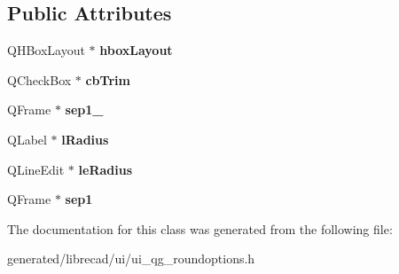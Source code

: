 \subsection*{Public Attributes}
\begin{DoxyCompactItemize}
\item 
\hypertarget{classUi__QG__RoundOptions_a55968d6979845fae80e27868399baea1}{Q\-H\-Box\-Layout $\ast$ {\bfseries hbox\-Layout}}\label{classUi__QG__RoundOptions_a55968d6979845fae80e27868399baea1}

\item 
\hypertarget{classUi__QG__RoundOptions_a46394f6279ed6edc93a2f8940219ec3c}{Q\-Check\-Box $\ast$ {\bfseries cb\-Trim}}\label{classUi__QG__RoundOptions_a46394f6279ed6edc93a2f8940219ec3c}

\item 
\hypertarget{classUi__QG__RoundOptions_a656df4b0eb34144384d9ed303dc5b619}{Q\-Frame $\ast$ {\bfseries sep1\-\_}}\label{classUi__QG__RoundOptions_a656df4b0eb34144384d9ed303dc5b619}

\item 
\hypertarget{classUi__QG__RoundOptions_ace7111af2d7ad0feac19c974ed008d31}{Q\-Label $\ast$ {\bfseries l\-Radius}}\label{classUi__QG__RoundOptions_ace7111af2d7ad0feac19c974ed008d31}

\item 
\hypertarget{classUi__QG__RoundOptions_a1559ce47f2f13e663c04f6e32e237fa7}{Q\-Line\-Edit $\ast$ {\bfseries le\-Radius}}\label{classUi__QG__RoundOptions_a1559ce47f2f13e663c04f6e32e237fa7}

\item 
\hypertarget{classUi__QG__RoundOptions_aefcdd2cd5eeea609a859b62f6d77db23}{Q\-Frame $\ast$ {\bfseries sep1}}\label{classUi__QG__RoundOptions_aefcdd2cd5eeea609a859b62f6d77db23}

\end{DoxyCompactItemize}


The documentation for this class was generated from the following file\-:\begin{DoxyCompactItemize}
\item 
generated/librecad/ui/ui\-\_\-qg\-\_\-roundoptions.\-h\end{DoxyCompactItemize}
